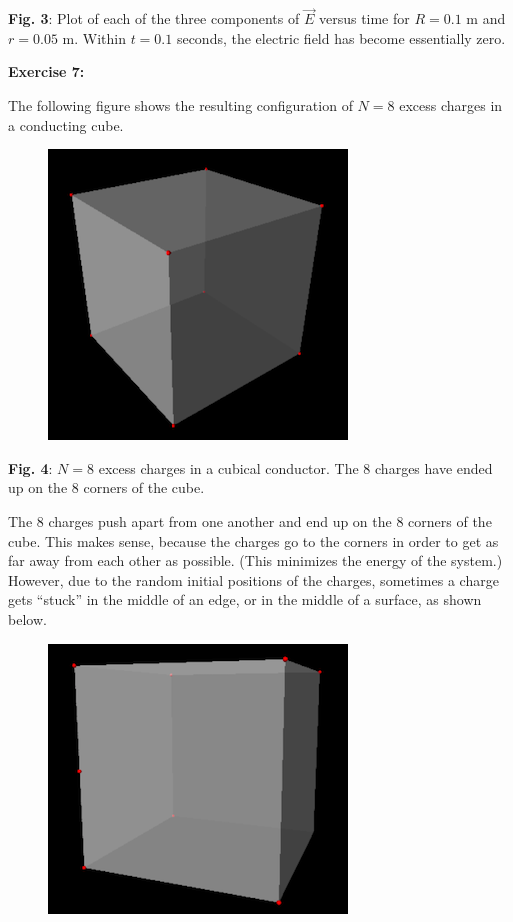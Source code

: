 \documentclass[]{article}
\begin{document}
\textbf{Fig. 3}: Plot of each of the three components of \(\vec{E}\)
versus time for \(R=0.1\) m and \(r=0.05\) m. Within \(t=0.1\) seconds,
the electric field has become essentially zero.

\textbf{Exercise 7:}

The following figure shows the resulting configuration of \(N=8\) excess
charges in a conducting cube.

\begin{figure}[htbp]
\centering
\includegraphics{images/cube_8.png}
\caption{}
\end{figure}

\textbf{Fig. 4}: \(N = 8\) excess charges in a cubical conductor. The 8
charges have ended up on the 8 corners of the cube.

The 8 charges push apart from one another and end up on the 8 corners of
the cube. This makes sense, because the charges go to the corners in
order to get as far away from each other as possible. (This minimizes
the energy of the system.) However, due to the random initial positions
of the charges, sometimes a charge gets ``stuck'' in the middle of an
edge, or in the middle of a surface, as shown below.

\begin{figure}[htbp]
\centering
\includegraphics{images/cube_8_edge.png}
\caption{}
\end{figure}
\end{document}
